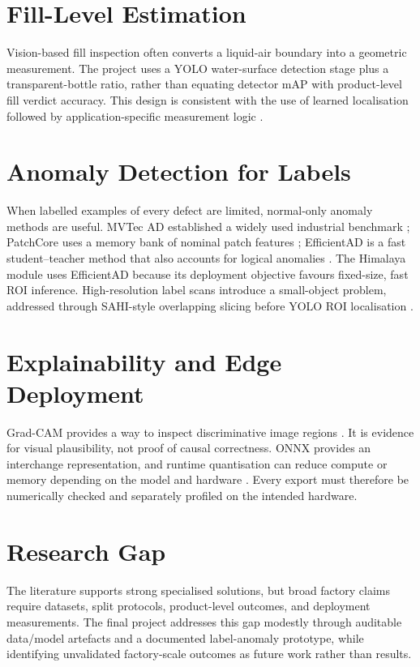 \documentclass[12pt,a4paper]{report}
\begin{document}
\section{Fill-Level Estimation}
Vision-based fill inspection often converts a liquid-air boundary into a geometric measurement. The project uses a YOLO water-surface detection stage plus a transparent-bottle ratio, rather than equating detector mAP with product-level fill verdict accuracy. This design is consistent with the use of learned localisation followed by application-specific measurement logic \cite{chatchapol2024,farhangi2024}.

\section{Anomaly Detection for Labels}
When labelled examples of every defect are limited, normal-only anomaly methods are useful. MVTec AD established a widely used industrial benchmark \cite{bergmann2019}; PatchCore uses a memory bank of nominal patch features \cite{roth2022}; EfficientAD is a fast student--teacher method that also accounts for logical anomalies \cite{batzner2024}. The Himalaya module uses EfficientAD because its deployment objective favours fixed-size, fast ROI inference. High-resolution label scans introduce a small-object problem, addressed through SAHI-style overlapping slicing before YOLO ROI localisation \cite{akyon2022}.

\section{Explainability and Edge Deployment}
Grad-CAM provides a way to inspect discriminative image regions \cite{selvaraju2017}. It is evidence for visual plausibility, not proof of causal correctness. ONNX provides an interchange representation, and runtime quantisation can reduce compute or memory depending on the model and hardware \cite{onnx2019,onnxruntime2026,jacob2018,krishnamoorthi2018}. Every export must therefore be numerically checked and separately profiled on the intended hardware.

\section{Research Gap}
The literature supports strong specialised solutions, but broad factory claims require datasets, split protocols, product-level outcomes, and deployment measurements. The final project addresses this gap modestly through auditable data/model artefacts and a documented label-anomaly prototype, while identifying unvalidated factory-scale outcomes as future work rather than results.
\end{document}
